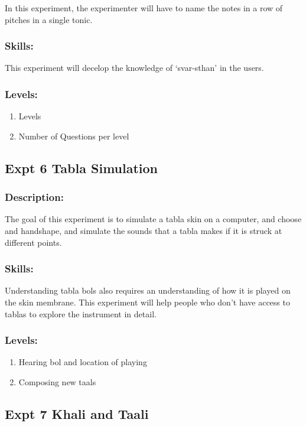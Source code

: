 \documentclass[11pt]{article}
\begin{document}
In this experiment, the experimenter will have to name the notes in a row of pitches in a single tonic.
\subsubsection{Skills:}
\label{sec-1-6-2}

This experiment will decelop the knowledge of `svar-sthan' in the users.
\subsubsection{Levels:}
\label{sec-1-6-3}


\begin{enumerate}
\item Levels
\item Number of Questions per level
\end{enumerate}
     
\subsection{Expt 6 Tabla Simulation}
\label{sec-1-7}
\subsubsection{Description:}
\label{sec-1-7-1}

The goal of this experiment is to simulate a tabla skin on a computer,
and choose and handshape, and simulate the sounds that a tabla makes
if it is struck at different points.
\subsubsection{Skills:}
\label{sec-1-7-2}

Understanding tabla bols also requires an understanding of how it is
played on the skin membrane. This experiment will help people who
don't have access to tablas to explore the instrument in detail.
\subsubsection{Levels:}
\label{sec-1-7-3}


\begin{enumerate}
\item Hearing bol and location of playing
\item Composing new taals
\end{enumerate}
     
\subsection{Expt 7 Khali and Taali}
\label{sec-1-8}
\end{document}
